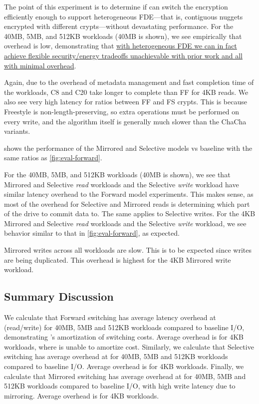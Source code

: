 

The point of this experiment is to determine if \sys can switch the encryption
efficiently enough to support heterogeneous FDE---that is, contiguous nuggets
encrypted with different crypts---without devastating performance. For the 40MB,
5MB, and 512KB workloads (40MB is shown), we see empirically that overhead is
low, demonstrating that \uline{with heterogeneous FDE we can in fact achieve
flexible security/energy tradeoffs unachievable with prior work and all with
minimal overhead}.

Again, due to the overhead of metadata management and fast completion time of
the workloads, C8 and C20 take longer to complete than FF for 4KB reads. We also
see very high latency for ratios between FF and FS crypts. This is because
Freestyle is non-length-preserving, so extra operations must be performed on
every write, and the algorithm itself is generally much slower than the ChaCha
variants.

 shows the performance of the Mirrored and Selective models vs
baseline with the same ratios as \cref{fig:eval-forward}.

For the 40MB, 5MB, and 512KB workloads (40MB is shown), we see that Mirrored and
Selective {\em read} workloads and the Selective {\em write} workload have
similar latency overhead to the Forward model experiments. This makes sense, as
most of the overhead for Selective and Mirrored reads is determining which part
of the drive to commit data to. The same applies to Selective writes. For the
4KB Mirrored and Selective {\em read} workloads and the Selective {\em write}
workload, we see behavior similar to that in \cref{fig:eval-forward}, as
expected.

Mirrored writes across all workloads are slow. This is to be expected since
writes are being duplicated. This overhead is highest for the 4KB Mirrored write
workload.


\subsection{Summary Discussion}\label{subsec:eval-overhead}

We calculate that Forward switching has average latency overhead at
 (read/write) for 40MB, 5MB and 512KB workloads compared to
baseline I/O, demonstrating \sys's amortization of switching costs. Average
overhead is  for 4KB workloads, where \sys is unable to amortize
cost. Similarly, we calculate that Selective switching has average overhead at
 for 40MB, 5MB and 512KB workloads compared to baseline I/O.
Average overhead is  for 4KB workloads. Finally, we calculate that
Mirrored switching has average overhead at  for 40MB, 5MB and
512KB workloads compared to baseline I/O, with high write latency due to
mirroring. Average overhead is  for 4KB workloads.

